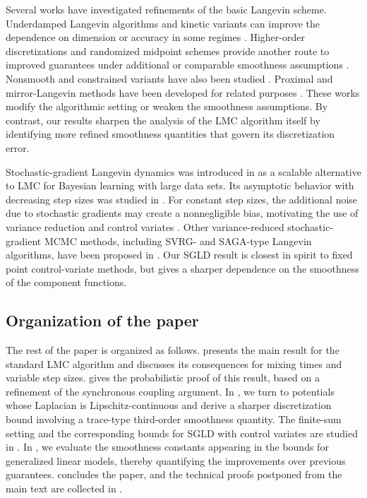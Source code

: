 \documentclass[aos,reqno]{imsart}
\theoremstyle{definition}
\begin{document}
Several works have investigated refinements of the basic
Langevin scheme. Underdamped Langevin algorithms and kinetic variants can
improve the dependence on dimension or accuracy in some
regimes \citep{cheng2018a,dalalyan_riou_2018,
monmarche2021high,zhang2023improved}. 
Higher-order discretizations and randomized midpoint
schemes provide another route to improved guarantees under
additional or comparable smoothness assumptions
\citep{shen2019randomized,Mou21,yu2025parallel}.
Nonsmooth and constrained variants have also been studied
\citep{bubeck2018sampling,lehec2023langevin}. Proximal and 
mirror-Langevin methods have
been developed for related purposes
\citep{brosse2017proximal,durmus2018efficient, 
chewi2020exponential,ahn2021efficient,chen22c}. These works 
modify the algorithmic setting or weaken the smoothness
assumptions.
By contrast, our results sharpen the analysis of the
LMC algorithm itself by identifying more refined
smoothness quantities that govern its discretization error.

Stochastic-gradient Langevin dynamics was introduced in
\cite{WellingT11} as a scalable alternative to LMC for
Bayesian learning with large data sets. Its asymptotic
behavior with decreasing step sizes was studied in
\cite{teh2016}. For constant step sizes, the additional
noise due to stochastic gradients may create a nonnegligible
bias, motivating the use of variance reduction and control
variates \citep{BrosseDM18,Nagapetyan,Baker19}. Other
variance-reduced stochastic-gradient MCMC methods, including
SVRG- and SAGA-type Langevin algorithms, have been proposed
in \cite{dubey2016,chatterji2018,zou2019}. Our SGLD result
is closest in spirit to fixed point control-variate methods,
but gives a sharper dependence on the smoothness of the
component functions.


\subsection{Organization of the paper}

The rest of the paper is organized as follows.
 presents the main result for the standard
LMC algorithm and discusses its
consequences for mixing times and variable step sizes.
 gives the probabilistic proof of
this result, based on a refinement of the synchronous
coupling argument. In , we turn to
potentials whose Laplacian is Lipschitz-continuous and
derive a sharper discretization bound involving a
trace-type third-order smoothness quantity. The
finite-sum setting and the corresponding bounds for SGLD
with control variates are studied in
. In , we evaluate the
smoothness constants appearing in the bounds for
generalized linear models, thereby
quantifying the improvements over previous guarantees.
 concludes the paper, and the
technical proofs postponed from the main text are collected
in .
\end{document}
